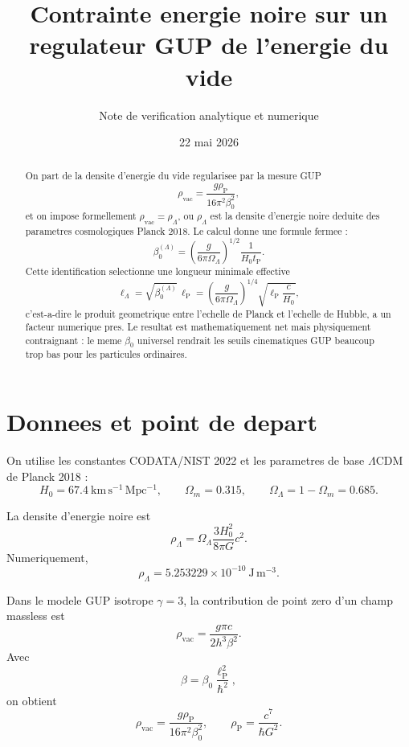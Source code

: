 \documentclass[11pt,a4paper]{article}
\title{Contrainte energie noire sur un regulateur GUP de l'energie du vide}
\author{Note de verification analytique et numerique}
\date{22 mai 2026}
\newcommand{\hb}{\hbar}
\newcommand{\lp}{\ell_{\mathrm P}}
\newcommand{\tP}{t_{\mathrm P}}
\newcommand{\rhoP}{\rho_{\mathrm P}}
\newcommand{\rhoL}{\rho_{\Lambda}}
\newcommand{\OmL}{\Omega_{\Lambda}}
\newcommand{\lL}{\ell_{\Lambda}}
\begin{document}
\maketitle

\begin{abstract}
On part de la densite d'energie du vide regularisee par la mesure GUP
\[
\rho_{\mathrm{vac}}=\frac{g\rhoP}{16\pi^2\beta_0^2},
\]
et on impose formellement $\rho_{\mathrm{vac}}=\rhoL$, ou $\rhoL$ est la
densite d'energie noire deduite des parametres cosmologiques Planck 2018. Le
calcul donne une formule fermee :
\[
\beta_0^{(\Lambda)}
=
\left(\frac{g}{6\pi\OmL}\right)^{1/2}\frac{1}{H_0\tP}.
\]
Cette identification selectionne une longueur minimale effective
\[
\lL
=
\sqrt{\beta_0^{(\Lambda)}}\,\lp
=
\left(\frac{g}{6\pi\OmL}\right)^{1/4}
\sqrt{\lp\frac{c}{H_0}},
\]
c'est-a-dire le produit geometrique entre l'echelle de Planck et l'echelle de
Hubble, a un facteur numerique pres. Le resultat est mathematiquement net mais
physiquement contraignant : le meme $\beta_0$ universel rendrait les seuils
cinematiques GUP beaucoup trop bas pour les particules ordinaires.
\end{abstract}

\section{Donnees et point de depart}

On utilise les constantes CODATA/NIST 2022 et les parametres de base
$\Lambda$CDM de Planck 2018 :
\begin{equation}
H_0=67.4\ \mathrm{km\,s^{-1}\,Mpc^{-1}},
\qquad
\Omega_m=0.315,
\qquad
\OmL=1-\Omega_m=0.685.
\end{equation}

La densite d'energie noire est
\begin{equation}
\rhoL
=
\OmL\frac{3H_0^2}{8\pi G}c^2.
\label{eq:rho_lambda}
\end{equation}
Numeriquement,
\begin{equation}
\rhoL=5.253229\times10^{-10}\ \mathrm{J\,m^{-3}}.
\end{equation}

Dans le modele GUP isotrope $\gamma=3$, la contribution de point zero d'un
champ massless est
\begin{equation}
\rho_{\mathrm{vac}}
=
\frac{g\pi c}{2h^3\beta^2}.
\end{equation}
Avec
\begin{equation}
\beta=\beta_0\frac{\lp^2}{\hb^2},
\end{equation}
on obtient
\begin{equation}
\rho_{\mathrm{vac}}
=
\frac{g\rhoP}{16\pi^2\beta_0^2},
\qquad
\rhoP=\frac{c^7}{\hb G^2}.
\label{eq:rho_vac_beta0}
\end{equation}
\end{document}
